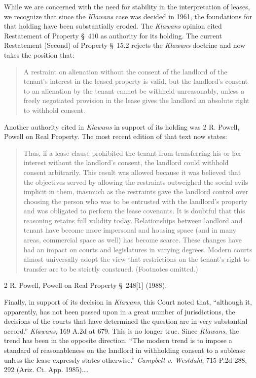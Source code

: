 While we are concerned with the need for stability in the interpretation of
leases, we recognize that since the \textit{Klawans} case was decided in 1961,
the foundations for that holding have been substantially eroded. The
\textit{Klawans} opinion cited Restatement of Property {\S}~410 as authority
for its holding. The current Restatement (Second) of Property {\S}~15.2 rejects
the \textit{Klawans} doctrine and now takes the position that: 
\begin{quote}
A restraint on alienation without the consent of the landlord of the tenant's
interest in the leased property is valid, but the landlord's consent to an
alienation by the tenant cannot be withheld unreasonably, unless a freely
negotiated provision in the lease gives the landlord an absolute right to
withhold consent.
\end{quote}

Another authority cited in \textit{Klawans} in support of its holding was 2 R.
Powell, Powell on Real Property. The most recent edition of that text now
states:
\begin{quote}
Thus, if a lease clause prohibited the tenant from transferring his or her
interest without the landlord's consent, the landlord could withhold consent
arbitrarily. This result was allowed because it was believed that the
objectives served by allowing the restraints outweighed the social evils
implicit in them, inasmuch as the restraints gave the landlord control over
choosing the person who was to be entrusted with the landlord's property and
was obligated to perform the lease covenants. It is doubtful that this
reasoning retains full validity today. Relationships between landlord and
tenant have become more impersonal and housing space (and in many areas,
commercial space as well) has become scarce. These changes have had an impact
on courts and legislatures in varying degrees. Modern courts almost universally
adopt the view that restrictions on the tenant's right to transfer are to be
strictly construed. (Footnotes omitted.) 
\end{quote}
2 R. Powell, Powell on Real Property \S~248[1] (1988).

Finally, in support of its decision in \textit{Klawans}, this Court noted that,
``although it, apparently, has not been passed upon in a great number of
jurisdictions, the decisions of the courts that have determined the question
are in very substantial accord.'' \textit{Klawans}, 169 A.2d at 679. This is no
longer true. Since \textit{Klawans}, the trend has been in the opposite
direction. ``The modern trend is to impose a standard of reasonableness on the
landlord in withholding consent to a sublease unless the lease expressly states
otherwise.'' \textit{Campbell v. Westdahl}, 715 P.2d 288, 292 (Ariz. Ct. App.
1985).\ldots

